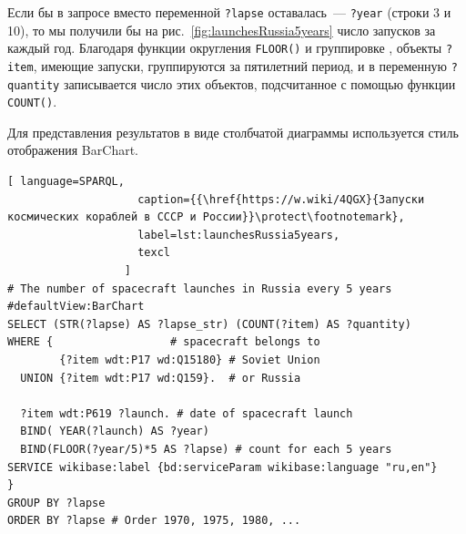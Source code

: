 Если бы в запросе вместо переменной \lstinline|?lapse| оставалась~--- \lstinline|?year| (строки 3 и 10), 
то мы получили бы на рис.~\ref{fig:launchesRussia5years} 
число запусков за каждый год. 
Благодаря функции округления \lstinline|FLOOR()|
и группировке%
, 
объекты \lstinline|?item|, имеющие запуски, группируются за пятилетний период, 
и в переменную \lstinline|?quantity| записывается число этих объектов, 
подсчитанное с помощью функции \lstinline|COUNT()|.

Для представления результатов в виде столбчатой диаграммы используется стиль отображения BarChart.

\label{question:spacecraft_1}

\begin{lstlisting}[ language=SPARQL, 
                    caption={{\href{https://w.wiki/4QGX}{Запуски космических кораблей в СССР и России}}\protect\footnotemark}, 
                    label=lst:launchesRussia5years,
                    texcl
                  ]
# The number of spacecraft launches in Russia every 5 years
#defaultView:BarChart
SELECT (STR(?lapse) AS ?lapse_str) (COUNT(?item) AS ?quantity)
WHERE {                  # spacecraft belongs to
        {?item wdt:P17 wd:Q15180} # Soviet Union
  UNION {?item wdt:P17 wd:Q159}.  # or Russia
  
  ?item wdt:P619 ?launch. # date of spacecraft launch
  BIND( YEAR(?launch) AS ?year) 
  BIND(FLOOR(?year/5)*5 AS ?lapse) # count for each 5 years
SERVICE wikibase:label {bd:serviceParam wikibase:language "ru,en"}
} 
GROUP BY ?lapse
ORDER BY ?lapse # Order 1970, 1975, 1980, ...
\end{lstlisting}

